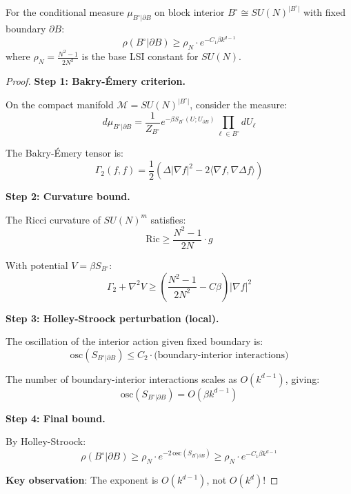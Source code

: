\begin{theorem}
\label{thm:interior-lsi}
For the conditional measure $\mu_{B^\circ | \partial B}$ on block interior 
$B^\circ \cong SU(N)^{|B^\circ|}$ with fixed boundary $\partial B$:
\begin{equation}
\rho(B^\circ | \partial B) \geq \rho_N \cdot e^{-C_1 \beta k^{d-1}}
\end{equation}
where $\rho_N = \frac{N^2-1}{2N^2}$ is the base LSI constant for $SU(N)$.
\end{theorem}

\begin{proof}
\textbf{Step 1: Bakry-Émery criterion.}

On the compact manifold $\mathcal{M} = SU(N)^{|B^\circ|}$, consider the measure:
\begin{equation}
d\mu_{B^\circ | \partial B} = \frac{1}{Z_{B^\circ}} e^{-\beta S_{B^\circ}(U; U_{\partial B})} \prod_{\ell \in B^\circ} dU_\ell
\end{equation}

The Bakry-Émery tensor is:
\begin{equation}
\Gamma_2(f, f) = \frac{1}{2}\left( \Delta |\nabla f|^2 - 2\langle \nabla f, \nabla \Delta f \rangle \right)
\end{equation}

\textbf{Step 2: Curvature bound.}

The Ricci curvature of $SU(N)^m$ satisfies:
\begin{equation}
\mathrm{Ric} \geq \frac{N^2-1}{2N} \cdot g
\end{equation}

With potential $V = \beta S_{B^\circ}$:
\begin{equation}
\Gamma_2 + \nabla^2 V \geq \left( \frac{N^2-1}{2N^2} - C\beta \right) |\nabla f|^2
\end{equation}

\textbf{Step 3: Holley-Stroock perturbation (local).}

The oscillation of the interior action given fixed boundary is:
\begin{equation}
\mathrm{osc}(S_{B^\circ | \partial B}) \leq C_2 \cdot \text{(boundary-interior interactions)}
\end{equation}

The number of boundary-interior interactions scales as $O(k^{d-1})$, giving:
\begin{equation}
\mathrm{osc}(S_{B^\circ | \partial B}) = O(\beta k^{d-1})
\end{equation}

\textbf{Step 4: Final bound.}

By Holley-Stroock:
\begin{equation}
\rho(B^\circ | \partial B) \geq \rho_N \cdot e^{-2\,\mathrm{osc}(S_{B^\circ | \partial B})} \geq \rho_N \cdot e^{-C_1 \beta k^{d-1}}
\end{equation}

\textbf{Key observation}: The exponent is $O(k^{d-1})$, not $O(k^d)$!
\end{proof}

